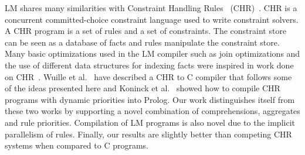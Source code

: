 
LM shares many similarities with Constraint Handling Rules~
(CHR)~\cite{Betz:2005kx,DBLP:journals/corr/abs-1006-3039}.  CHR is a concurrent
committed-choice constraint language used to write constraint solvers. A CHR
program is a set of rules and a set of constraints.  The constraint store can be
seen as a database of facts and rules manipulate the constraint store. Many
basic optimizations used in the LM compiler such as join optimizations and the
use of different data structures for indexing facts were inspired in work done
on CHR~\cite{DBLP:journals/corr/cs-PL-0408025}.  Wuille et al.~\cite{42866} have
described a CHR to C compiler that follows some of the ideas presented here and
Koninck et al.~\cite{chrp} showed how to compile CHR programs with dynamic
priorities into Prolog. Our work distinguishes itself from these two works by
supporting a novel combination of comprehensions, aggregates and rule
priorities. Compilation of LM programs is also novel due to the implicit
parallelism of rules. Finally, our results are slightly better than competing
CHR systems when compared to C programs.
